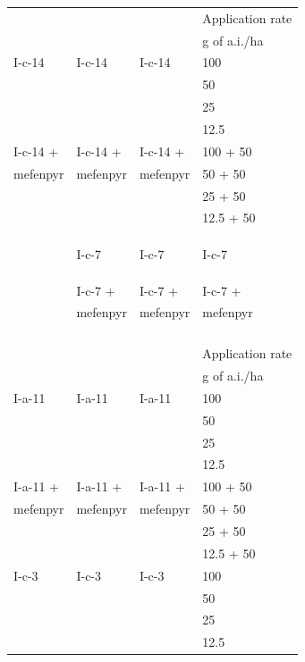 \documentclass[11pt,a4paper]{article}
\begin{document}
\begin{table}[h]
\begin{tabular}{|l|l|l|l|}
 &  &  &  \\ \hline
 &  &  & Application rate \\ \hline
 &  &  & g of a.i./ha \\ \hline
I-c-14 & I-c-14 & I-c-14 & 100 \\ \hline
 &  &  & 50 \\ \hline
 &  &  & 25 \\ \hline
 &  &  & 12.5 \\ \hline
I-c-14 + & I-c-14 + & I-c-14 + & 100 + 50 \\ \hline
mefenpyr & mefenpyr & mefenpyr & 50 + 50 \\ \hline
 &  &  & 25 + 50 \\ \hline
 &  &  & 12.5 + 50 \\ \hline
 &  &  &  \\ \hline
 &  &  &  \\ \hline
 &  &  &  \\ \hline
 & I-c-7 & I-c-7 & I-c-7 \\ \hline
 &  &  &  \\ \hline
 &  &  &  \\ \hline
 &  &  &  \\ \hline
 & I-c-7 + & I-c-7 + & I-c-7 + \\ \hline
 & mefenpyr & mefenpyr & mefenpyr \\ \hline
 &  &  &  \\ \hline
 &  &  &  \\ \hline
 &  &  &  \\ \hline
 &  &  &  \\ \hline
 &  &  & Application rate \\ \hline
 &  &  & g of a.i./ha \\ \hline
I-a-11 & I-a-11 & I-a-11 & 100 \\ \hline
 &  &  & 50 \\ \hline
 &  &  & 25 \\ \hline
 &  &  & 12.5 \\ \hline
I-a-11 + & I-a-11 + & I-a-11 + & 100 + 50 \\ \hline
mefenpyr & mefenpyr & mefenpyr & 50 + 50 \\ \hline
 &  &  & 25 + 50 \\ \hline
 &  &  & 12.5 + 50 \\ \hline
I-c-3 & I-c-3 & I-c-3 & 100 \\ \hline
 &  &  & 50 \\ \hline
 &  &  & 25 \\ \hline
 &  &  & 12.5 \\ \hline

\end{tabular}
\end{table}
\end{document}
